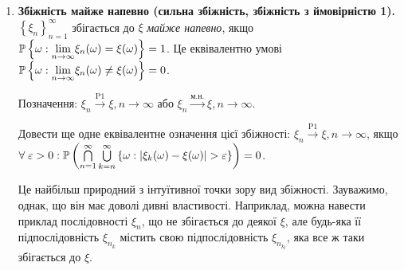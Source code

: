 \noindent\begin{enumerate}
    \item \textbf{Збіжність майже напевно (сильна збіжність, збіжність з ймовірністю 1).} 
    \noindent$\left\{ \xi_n\right\}_{n=1}^{\infty}$ збігається до $\xi$ \emph{майже напевно}, якщо
    $\P\left\{ \omega: \underset{n\to\infty}{\lim} \xi_n(\omega) = \xi(\omega)\right\} = 1$. 
    Це еквівалентно умові $\P\left\{ \omega: \underset{n\to\infty}{\lim} \xi_n(\omega) \neq \xi(\omega)\right\} = 0$.

    Позначення: $\xi_n \overset{\mathrm{P1}}{\longrightarrow} \xi, n \to \infty$ або $\xi_n \overset{\text{м.н.}}{\longrightarrow} \xi, n \to \infty$.
    \begin{exercise}
        Довести ще одне еквівалентне означення цієї збіжності: $\xi_n \overset{\mathrm{P1}}{\longrightarrow} \xi, n \to \infty$, якщо
        $\forall \; \varepsilon > 0: \P\left( \bigcap\limits_{n=1}^{\infty} \bigcup\limits_{k = n}^{\infty}
        \left\{ \omega : \left| \xi_k(\omega) - \xi(\omega)\right| > \varepsilon\right\}\right) = 0$.
    \end{exercise}

    Це найбільш природний з інтуїтивної точки зору вид збіжності. Зауважимо, однак, що він має доволі дивні властивості. Наприклад, можна навести приклад
    послідовності $\xi_n$, що не збігається до деякої $\xi$, але будь-яка її підпослідовність $\xi_{n_k}$ містить свою підпослідовність
    $\xi_{n_{k_l}}$, яка все ж таки збігається до $\xi$.
    

\end{enumerate}
